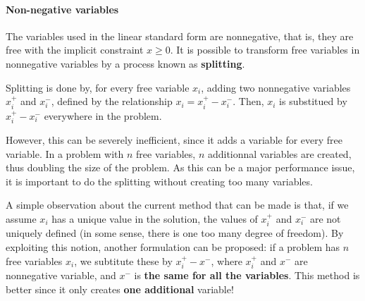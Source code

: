 \documentclass[a4paper]{article}
\begin{document}
\begin{center}
\end{center}

\paragraph{Non-negative variables}
The variables used in the linear standard form are nonnegative, that is, they are free with the implicit constraint $x \geq 0$. It is possible to transform free variables in nonnegative variables by a process known as \textbf{splitting}.

\begin{center}
\end{center}

Splitting is done by, for every free variable $x_i$, adding two nonnegative variables $x_i^+$ and $x_i^-$, defined by the relationship $x_i = x_i^+ - x_i^-$. Then, $x_i$ is substitued by $ x_i^+ - x_i^-$ everywhere in the problem.

However, this can be severely inefficient, since it adds a variable for every free variable. In a problem with $n$ free variables, $n$ additionnal variables are created, thus doubling the size of the problem. As this can be a major performance issue, it is important to do the splitting without creating too many variables. 

A simple observation about the current method that can be made is that, if we assume $x_i$ has a unique value in the solution, the values of $x_i^+$ and $x_i^-$ are not uniquely defined (in some sense, there is one too many degree of freedom). By exploiting this notion, another formulation can be proposed: if a problem has $n$ free variables $x_i$, we subtitute these by $x_i^+ - x^-$, where $x_i^+$ and $x^-$ are nonnegative variable, and $x^-$ is \textbf{the same for all the variables}. This method is better since it only creates \textbf{one additional} variable!
\end{document}
